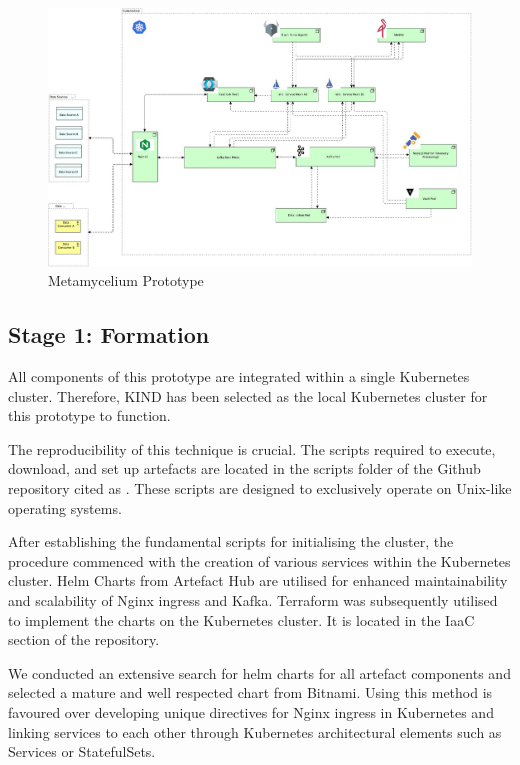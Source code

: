 \documentclass[journal]{IEEEtran}
\begin{document}
\begin{figure}[h]
    \centering
    \includegraphics[width=\linewidth]{images/metamyceliumConcrete.jpg}
    \caption{Metamycelium Prototype}
    \label{metamyceliumPrototype}
\end{figure}

\subsection{Stage 1: Formation}


All components of this prototype are integrated within a single Kubernetes cluster. Therefore, KIND \cite{KIND2023} has been selected as the local Kubernetes cluster for this prototype to function. 


The reproducibility of this technique is crucial. The scripts required to execute, download, and set up artefacts are located in the scripts folder of the Github repository cited as \cite{InfrastructureForMetamycelium2023}. These scripts are designed to exclusively operate on Unix-like operating systems.

After establishing the fundamental scripts for initialising the cluster, the procedure commenced with the creation of various services within the Kubernetes cluster. Helm Charts from Artefact Hub \cite{ArtifactHub2023} are utilised for enhanced maintainability and scalability of Nginx ingress and Kafka. Terraform was subsequently utilised to implement the charts on the Kubernetes cluster. It is located in the IaaC section of the repository. 

We conducted an extensive search for helm charts for all artefact components and selected a mature and well respected chart from Bitnami. Using this method is favoured over developing unique directives for Nginx ingress in Kubernetes and linking services to each other through Kubernetes architectural elements such as Services or StatefulSets.
\end{document}
